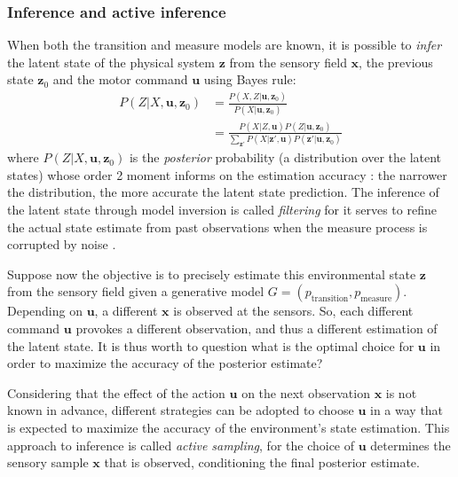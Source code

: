 \documentclass{article}
\begin{document}



\subsubsection{Inference and active inference}
When both the transition and measure models are known, it is possible to \emph{infer} the latent state of the physical system $\boldsymbol{z}$ from the sensory field $\boldsymbol{x}$, the previous state $\boldsymbol{z}_0$ and the motor command $\boldsymbol{u}$ using Bayes rule:
\begin{align}
P(Z|X,\boldsymbol{u},\boldsymbol{z}_0) &= \frac{P(X,Z|\boldsymbol{u},\boldsymbol{z}_0)}{P(X|\boldsymbol{u},\boldsymbol{z}_0)}\nonumber\\
&= \frac{P(X|Z,\boldsymbol{u}) P(Z|\boldsymbol{u},\boldsymbol{z}_0)}{\sum_{\boldsymbol{z}'}P(X|\boldsymbol{z}',\boldsymbol{u}) P(\boldsymbol{z}'|\boldsymbol{u},\boldsymbol{z}_0)}\label{eq:post}
\end{align}
where $P(Z|X,\boldsymbol{u},\boldsymbol{z}_0)$ is the \emph{posterior} probability (a distribution over the latent states) whose order 2 moment informs on the estimation accuracy : the narrower the distribution, the more accurate the latent state prediction. The inference of the latent state through model inversion is called \emph{filtering} for it serves to refine the actual state estimate from past observations when the measure process is corrupted by noise \cite{Kalman1960}.

Suppose now the objective is to precisely estimate this environmental state $\boldsymbol{z}$ from the sensory field given a generative model $G = (p_\text{transition}, p_\text{measure})$.
Depending on $\boldsymbol{u}$, a different $\boldsymbol{x}$ is observed at the sensors. So, each different command $\boldsymbol{u}$ provokes a different observation, and thus a different 
estimation of the latent state. It is thus worth to question what is the optimal choice for $\boldsymbol{u}$ in order to maximize the accuracy of the posterior estimate?

Considering that the effect of the action $\boldsymbol{u}$ on the next observation $\boldsymbol{x}$ is not known in advance, different strategies can be adopted to choose $\boldsymbol{u}$ in a way that is expected to maximize the accuracy of the environment's state estimation. This approach to inference is called \emph{active sampling}, for the choice of $\boldsymbol{u}$ determines the sensory sample $\boldsymbol{x}$ that is observed, conditioning the final posterior estimate.
\end{document}

